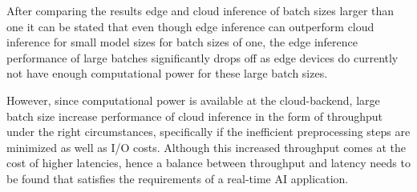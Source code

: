 \FloatBarrier

After comparing the results edge and cloud inference of batch sizes larger than one it can be stated that even though edge inference can outperform cloud inference for small model sizes for batch sizes of one, the edge inference performance of large batches significantly drops off as edge devices do currently not have enough computational power for these large batch sizes.

However, since computational power is available at the cloud-backend, large batch size increase performance of cloud inference in the form of throughput under the right circumstances, specifically if the inefficient preprocessing steps are minimized as well as I/O costs.
Although this increased throughput comes at the cost of higher latencies, hence a balance between throughput and latency needs to be found that satisfies the requirements of a real-time AI application.


